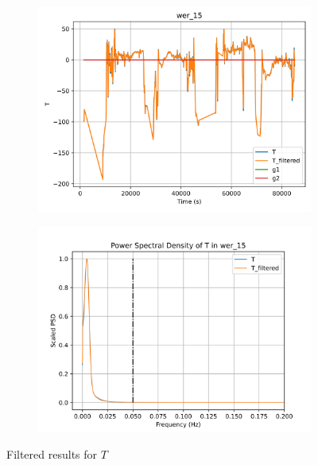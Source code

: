 \begin{figure}[H]

\begin{minipage}{0.49\textwidth}
        \begin{figure}[H]
                \centering
                \includegraphics[width = \textwidth]{./figs/trk_filt/wer_15/T.png}
        \end{figure}
\end{minipage}
\begin{minipage}{0.49\textwidth}
        \begin{figure}[H]
                \centering
                \includegraphics[width = \textwidth]{./figs/trk_filt/wer_15/T_psd.png}
        \end{figure}
\end{minipage}
\caption{Filtered results for $T$}

\end{figure}


